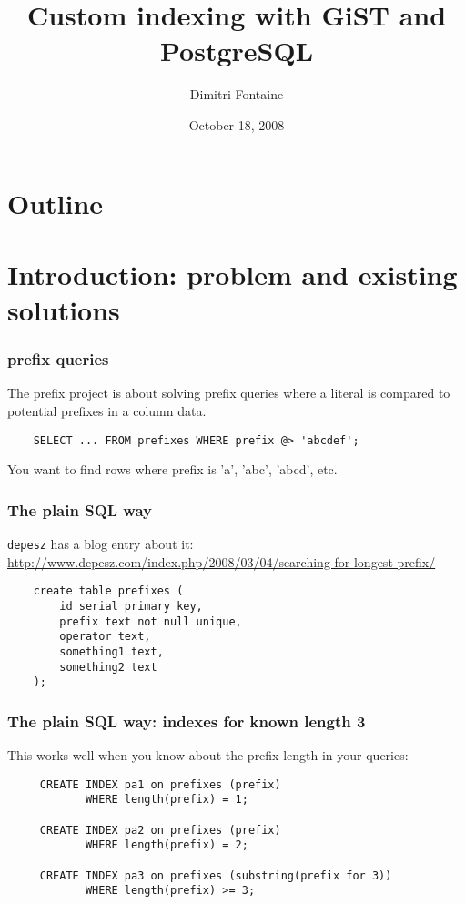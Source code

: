 \documentclass{beamer}
\title{Custom indexing with GiST and PostgreSQL}
\author{Dimitri Fontaine}
\date{October 18, 2008}
\begin{document}
\frame{\titlepage}

\section*{Outline}

\section{Introduction: problem and existing solutions}

\begin{frame}[fragile]
  \frametitle{prefix queries}

  The \alert{prefix} project is about solving prefix queries where a literal
  is compared to potential prefixes in a column data.

  \begin{example}
  \begin{verbatim}
    SELECT ... FROM prefixes WHERE prefix @> 'abcdef';
  \end{verbatim}
  \end{example}

  You want to find rows where prefix is 'a', 'abc', 'abcd', etc.
\end{frame}

\begin{frame}[fragile]
  \frametitle{The plain SQL way}
  
  \texttt{depesz} has a blog entry about it:
  \url{http://www.depesz.com/index.php/2008/03/04/searching-for-longest-prefix/}
  
  \begin{example}
  \begin{verbatim}
    create table prefixes (
        id serial primary key,
        prefix text not null unique,
        operator text,
        something1 text,
        something2 text
    );
  \end{verbatim}
  \end{example}
\end{frame}
  
\begin{frame}[fragile]
  \frametitle{The plain SQL way: indexes for known length 3}

  This works well when you know about the prefix length in your queries:

  \begin{example}
  \begin{verbatim}
     CREATE INDEX pa1 on prefixes (prefix) 
            WHERE length(prefix) = 1;

     CREATE INDEX pa2 on prefixes (prefix)
            WHERE length(prefix) = 2;

     CREATE INDEX pa3 on prefixes (substring(prefix for 3))
            WHERE length(prefix) >= 3;
  \end{verbatim}
  \end{example}
\end{frame}
\end{document}
